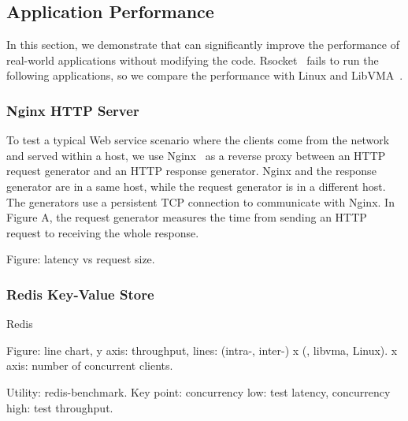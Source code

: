 \subsection{Application Performance}
\label{subsec:application}

In this section, we demonstrate that \sys{} can significantly improve the performance of real-world applications without modifying the code.
Rsocket~\cite{rsockets} fails to run the following applications, so we compare the performance with Linux and LibVMA~\cite{libvma}.

\subsubsection{Nginx HTTP Server}
\quad

To test a typical Web service scenario where the clients come from the network and served within a host, we use Nginx~\cite{nginx} as a reverse proxy between an HTTP request generator and an HTTP response generator.
Nginx and the response generator are in a same host, while the request generator is in a different host.
The generators use a persistent TCP connection to communicate with Nginx.
In Figure A, the request generator measures the time from sending an HTTP request to receiving the whole response.

Figure: latency vs request size.


\subsubsection{Redis Key-Value Store}
\quad

Redis~\cite{redis}

Figure: line chart, y axis: throughput, lines: (intra-, inter-) x (\sys{}, libvma, Linux). x axis: number of concurrent clients.

Utility: redis-benchmark.
Key point: concurrency low: test latency, concurrency high: test throughput.


